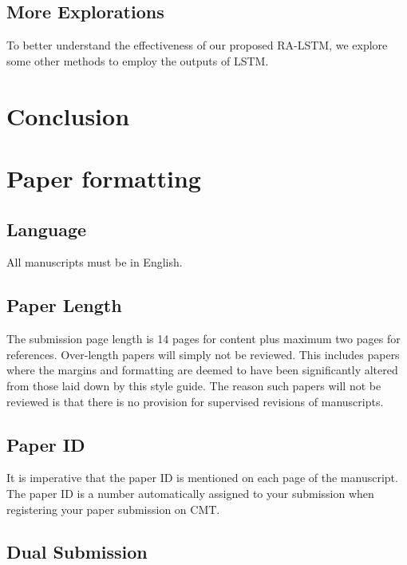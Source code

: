 \documentclass[runningheads]{llncs}
\begin{document}
\subsection{More Explorations}
To better understand the effectiveness of our proposed RA-LSTM, we explore some other methods to employ the outputs of LSTM. 

\section{Conclusion}

\section{Paper formatting}

\subsection{Language}

All manuscripts must be in English.

\subsection{Paper Length}
The submission page length is 14 pages for content plus maximum two pages for references.
Over-length papers will
simply not be reviewed. This includes papers where the margins and
formatting are deemed to have been significantly altered from those
laid down by this style guide. The reason such papers will not be
reviewed is that there is no provision for supervised revisions of
manuscripts. 

\subsection{Paper ID}

It is imperative that the paper ID is mentioned on each page of the manuscript.
The paper ID is a number automatically assigned to your submission when 
registering your paper submission on CMT.

\subsection{Dual Submission}
\end{document}
